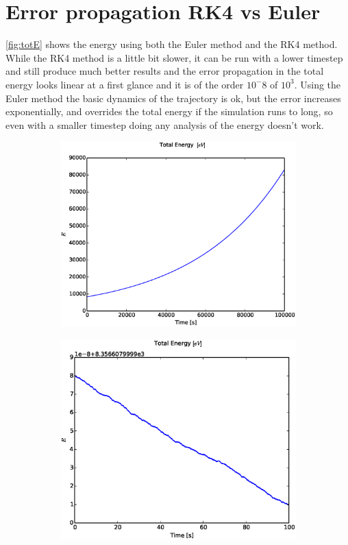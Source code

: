 \documentclass[x11names]{article}
\begin{document}
\section{Error propagation RK4 vs Euler}
  \cref{fig:totE} shows the energy using both the Euler method and the RK4 method. While the RK4 method is a little bit slower, it can be run with a lower timestep and still produce much better results and the error propagation in the total energy looks linear at a first glance and it is of the order \(10^-8\) of \(10^3\). Using the Euler method the basic dynamics of the trajectory is ok, but the error increases exponentially, and overrides the total energy if the simulation runs to long, so even with a smaller timestep doing any analysis of the energy doesn't work.
  \label{sec:error}
    \begin{figure}[ht]
    \centering
      \begin{subfigure}{0.45\textwidth}
        \includegraphics[width = \textwidth]{figures/EulerEnergy}
      \end{subfigure}
      \begin{subfigure}{0.45\textwidth}
        \includegraphics[width = \textwidth]{figures/rk4Energy}

\end{subfigure}
\end{figure}
\end{document}
